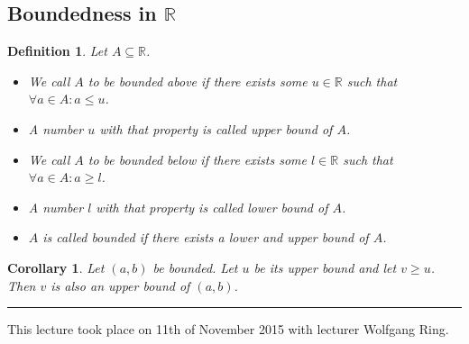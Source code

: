 \documentclass[a4paper,landscape,twocolumn]{article}
\newtheorem{defi}{Definition}
\newtheorem{cor}{Corollary}
\newcommand\meta[3]{\hrule{} This #1 took place on #2 with lecturer #3.\par}
\begin{document}
\subsection{Boundedness in $\mathbb R$}
\begin{defi}
  Let $A \subseteq \mathbb R$.
  \begin{itemize}
    \item We call $A$ to be \emph{bounded above} if there exists some $u \in \mathbb R$ such that $\forall a \in A: a \leq u$.
    \item A number $u$ with that property is called \emph{upper bound of $A$}.
    \item We call $A$ to be \emph{bounded below} if there exists some $l \in \mathbb R$ such that $\forall a \in A: a \geq l$.
    \item A number $l$ with that property is called \emph{lower bound of $A$}.
    \item $A$ is called \emph{bounded} if there exists a lower and upper bound of $A$.
  \end{itemize}
\end{defi}

\begin{cor}
  Let $(a, b)$ be bounded.
  Let $u$ be its upper bound and let $v \geq u$.
  Then $v$ is also an upper bound of $(a, b)$.
\end{cor}

\meta{lecture}{11th of November 2015}{Wolfgang Ring}
\end{document}
